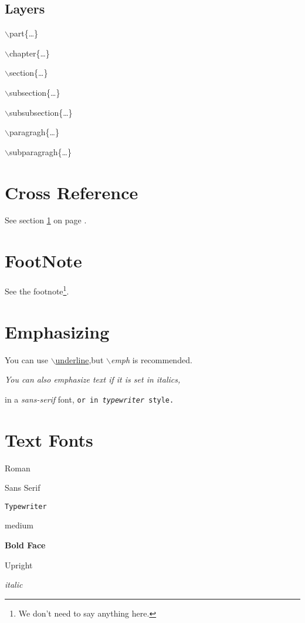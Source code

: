 \subsection{Layers}

$\backslash$part\{\ldots\}

$\backslash$chapter\{\ldots\}

$\backslash$section\{\ldots\}

$\backslash$subsection\{\ldots\}

$\backslash$subsubsection\{\ldots\}

$\backslash$paragragh\{\ldots\}

$\backslash$subparagragh\{\ldots\}

\section{Cross Reference}

\label{Cross Reference} See section \ref{Cross Reference} on page
\pageref{Cross Reference}.

\section{FootNote}

See the footnote\footnote{We don't need to say anything here.}.

\section{Emphasizing}

You can use \underline{$\backslash$underline},but
\emph{$\backslash$emph} is recommended.

\textit{You can also \emph{emphasize} text if it is set in italics,}

\textsf{in a \emph{sans-serif} font,} \texttt{or in
\emph{typewriter} style.}

\section{Text Fonts}

\textrm{Roman}

\textsf{Sans Serif}

\texttt{Typewriter}

\textmd{medium}

\textbf{Bold Face}

\textup{Upright}

\textit{italic}

